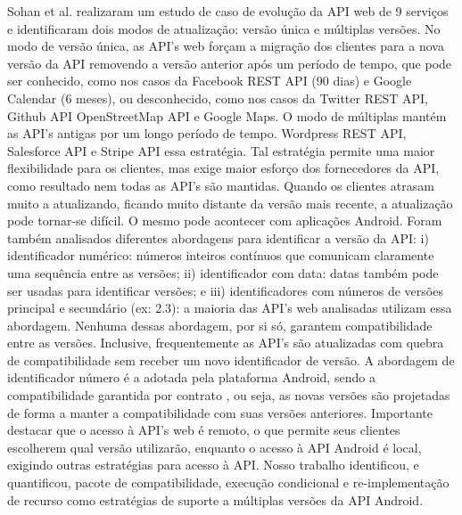 Sohan et al. \cite{Sohan2015} realizaram um estudo de caso de evolução da API
web de 9 serviços e identificaram dois modos de atualização: versão única e
múltiplas versões. No modo de versão única, as API's web forçam a migração dos
clientes para a nova versão da API removendo a versão anterior após um período
de tempo, que pode ser conhecido, como nos casos da Facebook REST API (90 dias)
e Google Calendar (6 meses), ou desconhecido, como nos casos da Twitter REST API,
Github API OpenStreetMap API e Google Maps. O modo de múltiplas mantém as API's
antigas por um longo período de tempo. Wordpress REST API, Salesforce API e Stripe
API essa estratégia. Tal estratégia permite uma maior flexibilidade para os clientes,
mas exige maior esforço dos fornecedores da API, como resultado nem todas as API's são
mantidas. Quando os clientes atrasam muito a atualizando, ficando muito distante da
versão mais recente, a atualização pode tornar-se difícil. O mesmo pode acontecer
com aplicações Android. Foram também analisados diferentes abordagens para identificar
a versão da API: i) identificador numérico: números inteiros contínuos que comunicam
claramente uma sequência entre as versões; ii) identificador com data: datas também
pode ser usadas para identificar versões; e iii) identificadores com números de versões
principal e secundário (ex: 2.3): a maioria das API's web analisadas utilizam essa
abordagem. Nenhuma dessas abordagem, por si só, garantem compatibilidade entre as versões.
Inclusive, frequentemente as API's são atualizadas com quebra de compatibilidade sem receber
um novo identificador de versão. A abordagem de identificador número é a adotada pela
plataforma Android, sendo a compatibilidade garantida por contrato \cite{ApiLevels},
ou seja, as novas versões são projetadas de forma a manter a compatibilidade com suas
versões anteriores.   Importante destacar que o acesso à API's web é remoto, o que permite
seus clientes escolherem qual versão utilizarão, enquanto o acesso à API Android é local,
exigindo outras estratégias para acesso à API. Nosso trabalho identificou, e quantificou,
pacote de compatibilidade, execução condicional e re-implementação de recurso como estratégias
de suporte a múltiplas versões da API Android.
